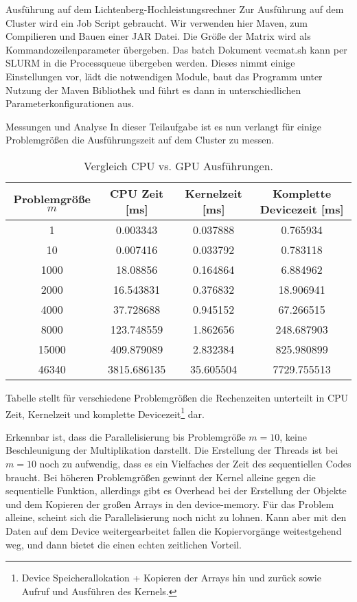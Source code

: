 \documentclass[
ngerman,
subtask=ruled %
]{tudaexercise}
\begin{document}
	
	\begin{task}{Ausführung auf dem Lichtenberg-Hochleistungsrechner} 
		Zur Ausführung auf dem Cluster wird ein Job Script gebraucht.
		Wir verwenden hier Maven, zum Compilieren und Bauen einer JAR Datei.
		Die Größe der Matrix wird als Kommandozeilenparameter übergeben.
		Das batch Dokument vecmat.sh kann per SLURM in die Processqueue übergeben werden.
		Dieses nimmt einige Einstellungen vor, lädt die notwendigen Module, baut das Programm unter Nutzung der Maven Bibliothek und führt es dann in unterschiedlichen Parameterkonfigurationen aus.
	\end{task}

	\begin{task}{Messungen und Analyse} 
		In dieser Teilaufgabe ist es nun verlangt für einige Problemgrößen die Ausführungszeit auf dem Cluster zu messen.
		
		
		\begin{table}[H]
			\centering
			\begin{tabular}{|c|c|c|c|}
				\hline
				\textbf{Problemgröße} $m$ & \textbf{CPU Zeit} [ms] & \textbf{Kernelzeit} [ms] & \textbf{Komplette Devicezeit} [ms]  \\
				\hline
				1 & 0.003343 & 0.037888 & 0.765934 \\
				10 & 0.007416 & 0.033792 & 0.783118 \\
				1000 & 18.08856 & 0.164864 & 6.884962 \\
				2000 & 16.543831 & 0.376832 & 18.906941 \\
				4000 & 37.728688 & 0.945152 & 67.266515 \\
				8000 & 123.748559 & 1.862656 & 248.687903 \\
				15000 & 409.879089 & 2.832384 & 825.980899 \\
				46340 & 3815.686135 & 35.605504 & 7729.755513 \\
				\hline
			\end{tabular}
			\caption{Vergleich CPU vs. GPU Ausführungen.}
			\label{tab:data}
		\end{table}
		Tabelle \cite{tab:data} stellt für verschiedene Problemgrößen die Rechenzeiten unterteilt in CPU Zeit, Kernelzeit und komplette Devicezeit\footnote{Device Speicherallokation + Kopieren der Arrays hin und zurück sowie Aufruf und Ausführen des Kernels.} dar.
	
		Erkennbar ist, dass die Parallelisierung bis Problemgröße $m=10$, keine Beschleunigung der Multiplikation darstellt.
		Die Erstellung der Threads ist bei $m=10$ noch zu aufwendig, dass es ein Vielfaches der Zeit des sequentiellen Codes braucht.
		Bei höheren Problemgrößen gewinnt der Kernel alleine gegen die sequentielle Funktion, allerdings gibt es Overhead bei der Erstellung der Objekte und dem Kopieren der großen Arrays in den device-memory.
		Für das Problem alleine, scheint sich die Parallelisierung noch nicht zu lohnen.
		Kann aber mit den Daten auf dem Device weitergearbeitet fallen die Kopiervorgänge weitestgehend weg, und dann bietet die einen echten zeitlichen Vorteil.
	\end{task}
\end{document}
